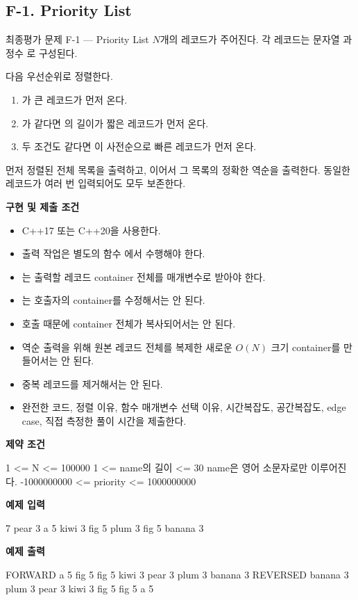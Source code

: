 \subsection{F-1. Priority List}
\begin{problembox}{최종평가 문제 F-1 --- Priority List}
$N$개의 레코드가 주어진다. 각 레코드는 문자열 과 정수 로 구성된다.

다음 우선순위로 정렬한다.
\begin{enumerate}
  \item {}가 큰 레코드가 먼저 온다.
  \item {}가 같다면 의 길이가 짧은 레코드가 먼저 온다.
  \item 두 조건도 같다면 이 사전순으로 빠른 레코드가 먼저 온다.
\end{enumerate}

먼저 정렬된 전체 목록을 출력하고, 이어서 그 목록의 정확한 역순을 출력한다. 동일한  레코드가 여러 번 입력되어도 모두 보존한다.

\textbf{구현 및 제출 조건}
\begin{itemize}
  \item C++17 또는 C++20을 사용한다.
  \item 출력 작업은 별도의 함수 에서 수행해야 한다.
  \item {}는 출력할 레코드 container 전체를 매개변수로 받아야 한다.
  \item {}는 호출자의 container를 수정해서는 안 된다.
  \item {} 호출 때문에 container 전체가 복사되어서는 안 된다.
  \item 역순 출력을 위해 원본 레코드 전체를 복제한 새로운 $O(N)$ 크기 container를 만들어서는 안 된다.
  \item 중복 레코드를 제거해서는 안 된다.
  \item 완전한 코드, 정렬 이유, 함수 매개변수 선택 이유, 시간복잡도, 공간복잡도, edge case, 직접 측정한 풀이 시간을 제출한다.
\end{itemize}

\textbf{제약 조건}
\begin{TextBlock}
1 <= N <= 100000
1 <= name의 길이 <= 30
name은 영어 소문자로만 이루어진다.
-1000000000 <= priority <= 1000000000
\end{TextBlock}

\textbf{예제 입력}
\begin{TextBlock}
7
pear 3
a 5
kiwi 3
fig 5
plum 3
fig 5
banana 3
\end{TextBlock}

\textbf{예제 출력}
\begin{TextBlock}
FORWARD
a 5
fig 5
fig 5
kiwi 3
pear 3
plum 3
banana 3
REVERSED
banana 3
plum 3
pear 3
kiwi 3
fig 5
fig 5
a 5
\end{TextBlock}
\end{problembox}

